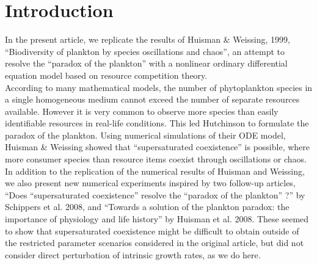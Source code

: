 \section{Introduction}
In the present article, we replicate the results of Huisman  \&  Weissing, 1999, 
``Biodiversity of plankton by species oscillations and 
chaos''\supercite{1999:Huisman}, an attempt to resolve the ``paradox of 
the plankton''\supercite{1961:Hutchinson} with a nonlinear ordinary differential equation model based on resource competition theory.\\

According to many mathematical models, the number of phytoplankton species in a 
single homogeneous medium cannot exceed the number of separate resources 
available\supercite{1960:Hardin,1973:Phillips,1980:Armstrong}. However it is 
very common to observe more species than easily identifiable resources in real-life conditions. This 
led Hutchinson to formulate the paradox of the plankton\supercite{1961:Hutchinson}. Using 
numerical simulations of their ODE model, Huisman \& Weissing\supercite{1999:Huisman} showed that 
``supersaturated coexistence'' is possible, where more consumer species than resource items coexist through oscillations or chaos.\\

In addition to the replication of the numerical results of Huisman and Weissing, we also present new numerical experiments inspired by two follow-up articles, ``Does ``supersaturated coexistence'' resolve the ``paradox of the plankton'' 
?'' by Schippers et al. 2008\supercite{2008:Schippers}, and ``Towards a solution of the plankton paradox: the  importance of physiology and life history” by Huisman et al. 2008\supercite{2008:Huisman}. 
These seemed to show that supersaturated coexistence might be difficult to obtain outside of the restricted parameter scenarios considered in the original article, but did not consider direct perturbation of intrinsic growth rates, as we do here. 

